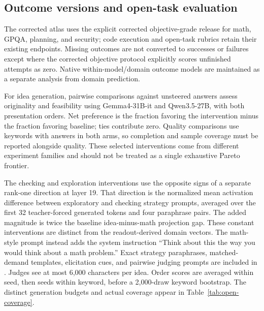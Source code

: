 \subsection{Outcome versions and open-task evaluation}
The corrected atlas uses the explicit corrected objective-grade release for math, GPQA, planning, and security; code execution and open-task rubrics retain their existing endpoints. Missing outcomes are not converted to successes or failures except where the corrected objective protocol explicitly scores unfinished attempts as zero. Native within-model/domain outcome models are maintained as a separate analysis from domain prediction.

For idea generation, pairwise comparisons against unsteered answers assess originality and feasibility using Gemma4-31B-it and Qwen3.5-27B, with both presentation orders. Net preference is the fraction favoring the intervention minus the fraction favoring baseline; ties contribute zero. Quality comparisons use keywords with answers in both arms, so completion and sample coverage must be reported alongside quality. These selected interventions come from different experiment families and should not be treated as a single exhaustive Pareto frontier.

The checking and exploration interventions use the opposite signs of a separate rank-one direction at layer 19. That direction is the normalized mean activation difference between exploratory and checking strategy prompts, averaged over the first 32 teacher-forced generated tokens and four paraphrase pairs. The added magnitude is twice the baseline idea-minus-math projection gap. These constant interventions are distinct from the readout-derived domain vectors. The math-style prompt instead adds the system instruction ``Think about this the way you would think about a math problem.'' Exact strategy paraphrases, matched-demand templates, elicitation cues, and pairwise judging prompts are included in . Judges see at most 6,000 characters per idea. Order scores are averaged within seed, then seeds within keyword, before a 2,000-draw keyword bootstrap. The distinct generation budgets and actual coverage appear in Table~\ref{tab:open-coverage}.

